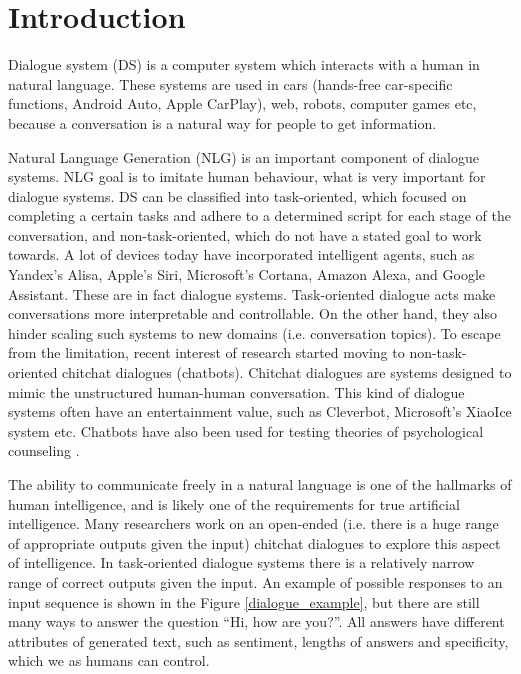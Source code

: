 \chapter{Introduction}\label{introduction}
Dialogue system (DS) is a computer system which interacts with a human in natural language. These systems are used in cars (hands-free car-specific functions, Android Auto, Apple CarPlay), web, robots, computer games etc, because a conversation is a natural way for people to get information. 

Natural Language Generation (NLG) is an important component of dialogue systems. NLG goal is to imitate human behaviour, what is very important for dialogue systems. DS can be classified into task-oriented, which focused on completing a certain tasks and adhere to a determined script for each stage of the conversation, and non-task-oriented, which do not have a stated goal to work towards. A lot of devices today have incorporated intelligent agents, such as Yandex’s Alisa, Apple’s Siri, Microsoft’s Cortana, Amazon Alexa, and Google Assistant. These are in fact dialogue systems. Task-oriented dialogue acts make conversations more interpretable and controllable. On the other hand, they also hinder scaling such systems to new domains (i.e. conversation topics). To escape from the limitation, recent interest of research started moving to non-task-oriented chitchat dialogues (chatbots). Chitchat dialogues are systems designed to mimic the unstructured human-human conversation. This kind of dialogue systems often have an entertainment value, such as Cleverbot, Microsoft's XiaoIce system etc. Chatbots have also been used for testing theories of psychological counseling \cite{vaidyam2019chatbots}.

The ability to communicate freely in a natural language is one of the hallmarks of human intelligence, and is likely one of the requirements for true artificial intelligence. Many researchers work on an open-ended (i.e. there is a huge range of appropriate outputs given the input) chitchat dialogues to explore this aspect of intelligence. In task-oriented dialogue systems there is a relatively narrow range of correct outputs given the input. An example of possible responses to an input sequence is shown in the Figure \ref{dialogue_example}, but there are still many ways to answer the question ``Hi, how are you?''. All answers have different attributes of generated text, such as sentiment, lengths of answers and specificity, which we as humans can control.  

